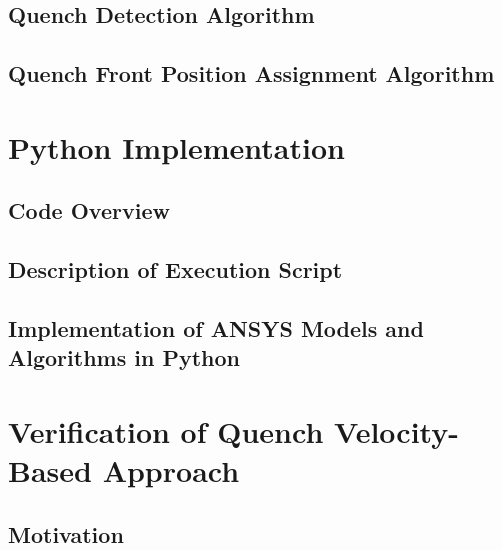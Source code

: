 \documentclass[11pt,a4paper]{report}
\begin{document}
\section{Quench Detection Algorithm}
\label{section:quench_detection_algorithm}


\section{Quench Front Position Assignment Algorithm}
\label{section:node_searching_algorithm}


\clearpage
\chapter{Python Implementation}
\label{chapter:python_implementation}

\section{Code Overview}
\label{section:code_overview}


\section{Description of Execution Script}


\section{Implementation of ANSYS Models and Algorithms in Python}
\label{section:description_main_classes}


\clearpage
\chapter{Verification of Quench Velocity-Based Approach}
\label{chapter:quench_velocity_benchmarking}

\section{Motivation}

\end{document}
